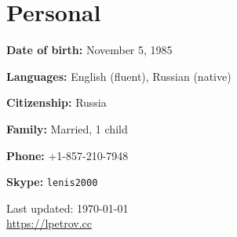 \documentclass[letterpaper,11pt]{article}
\def\footerlink{https://lpetrov.cc}
\begin{document}
\section*{Personal}

\textbf{Date of birth:} November 5, 1985

\textbf{Languages:} English (fluent), Russian (native)

\textbf{Citizenship:} Russia

\textbf{Family:} Married, 1 child

\textbf{Phone:} +1-857-210-7948

\textbf{Skype:} \texttt{lenis2000}

\bigskip

\begin{center}
	\begin{footnotesize}
		Last updated: \today \\ \href{\footerlink}{\url{\footerlink}}
	\end{footnotesize}
\end{center}
\end{document}
